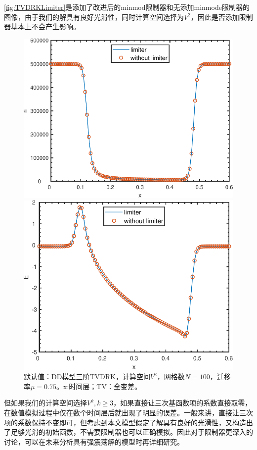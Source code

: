 \autoref{fig:TVDRKLimiter}是添加了改进后的minmod限制器和无添加minmode限制器的图像，由于我们的解具有良好光滑性，同时计算空间选择为$V^2$，因此是否添加限制器基本上不会产生影响。
\begin{figure}
    \centering
    \begin{minipage}{0.48\textwidth}
        \centering
        \includegraphics[width=\linewidth]{figure/DDTVDRK3Degree2N100mu0.75limitern.pdf}
    \end{minipage}
    \begin{minipage}{0.48\textwidth}
        \centering
        \includegraphics[width=\linewidth]{figure/DDTVDRK3Degree2N100mu0.75limiterE.pdf}
    \end{minipage}
    \caption{默认值：DD模型三阶TVDRK，计算空间$V^2$，网格数$N=100$，迁移率$\mu=0.75$。x:时间层；TV：全变差。}
    \label{fig:TVDRKLimiter}
\end{figure}
但如果我们的计算空间选择$V^k , k\geq 3$，如果直接让三次基函数项的系数直接取零，在数值模拟过程中仅在数个时间层后就出现了明显的误差。一般来讲，直接让三次项的系数保持不变即可，但考虑到本文模型假定了解具有良好的光滑性，又构造出了足够光滑的初始函数，不需要限制器也可以正确模拟。因此对于限制器更深入的讨论，可以在未来分析具有强震荡解的模型时再详细研究。
